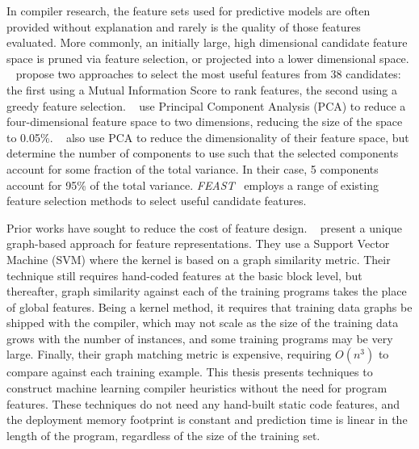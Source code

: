 In compiler research, the feature sets used for predictive models are often provided without explanation and rarely is the quality of those features evaluated. More commonly, an initially large, high dimensional candidate feature space is pruned via feature selection, or projected into a lower dimensional space.
\citeauthor{Stephenson2005}~\cite{Stephenson2005} propose two approaches to select the most useful features from 38 candidates: the first using a Mutual Information Score to rank features, the second using a greedy feature selection.
\citeauthor{Collins2013}~\cite{Collins2013} use Principal Component Analysis (PCA) to reduce a four-dimensional feature space to two dimensions, reducing the size of the space to 0.05\%.
\citeauthor{Dubach2007}~\cite{Dubach2007} also use PCA to reduce the dimensionality of their feature space, but determine the number of components to use such that the selected components account for some fraction of the total variance. In their case, 5 components account for 95\% of the total variance.
\emph{FEAST}~\cite{Ting2016} employs a range of existing feature selection methods to select useful candidate features.

Prior works have sought to reduce the cost of feature design.
\citeauthor{Park2012}~\cite{Park2012} present a unique graph-based approach for feature representations. They use a Support Vector Machine (SVM) where the kernel is based on a graph similarity metric. Their technique still requires hand-coded features at the basic block level, but thereafter, graph similarity against each of the training programs takes the place of global features. Being a kernel method, it requires that training data graphs be shipped with the compiler, which may not scale as the size of the training data grows with the number of instances, and some training programs may be very large. Finally, their graph matching metric is expensive, requiring $O(n^3)$ to compare against each training example. This thesis presents techniques to construct machine learning compiler heuristics without the need for program features. These techniques do not need any hand-built static code features, and the deployment memory footprint is constant and prediction time is linear in the length of the program, regardless of the size of the training set.

